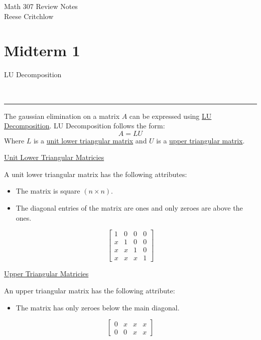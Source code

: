 \documentclass{article}
\newcommand{\header}[1]{\begin{large}\noindent #1\end{large}\\\rule{\textwidth}{0.5pt}}
\newcommand{\centertext}[1]{\begin{center}#1\end{center}}
\begin{document}
    \begin{center}
        \Large Math 307 Review Notes\\
        \normalsize Reese Critchlow
    \end{center}
    
    \section*{Midterm 1}


    \header{LU Decomposition}

    The gaussian elimination on a matrix $A$ can be expressed using \underline{LU Decomposition}.
    LU Decomposition follows the form:
    \[
        A = LU  
    \]
    Where $L$ is a \underline{unit lower triangular matrix} and $U$ is a \underline{upper triangular matrix}.
    \begin{multicols}{2}
        \centertext{\underline{Unit Lower Triangular Matricies}}

        A unit lower triangular matrix has the following attributes:
        \begin{itemize}
            \item The matrix is square $(n \times n)$.
            \item The diagonal entries of the matrix are ones and only zeroes are
            above the ones.
        \end{itemize}
        \[
            \begin{bmatrix}
                1 & 0 & 0 & 0 \\
                x & 1 & 0 & 0 \\
                x & x & 1 & 0 \\
                x & x & x & 1
            \end{bmatrix}
        \]
        \vfill\null\columnbreak
            
        \centertext{\underline{Upper Triangular Matricies}}
        An upper triangular matrix has the following attribute:
        \begin{itemize}
            \item The matrix has only zeroes below the main diagonal.
        \end{itemize}
        \[
            \begin{bmatrix}
                0 & x & x & x\\
                0 & 0 & x & x
            \end{bmatrix}  
        \]
        \vfill\null
    \end{multicols}
\end{document}
